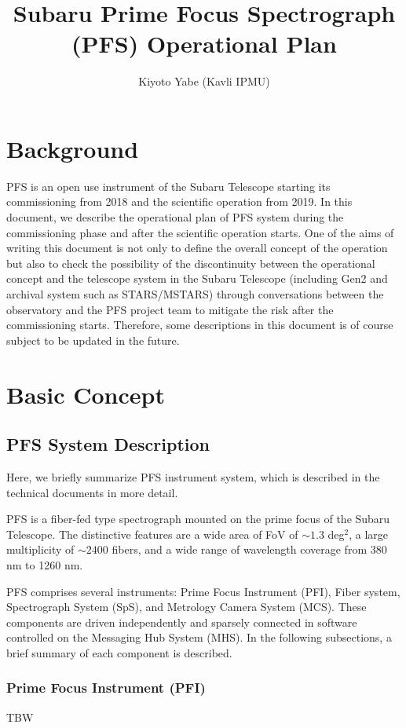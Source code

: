 \documentclass[a4paper]{article}
\title{Subaru Prime Focus Spectrograph (PFS) Operational Plan}
\author{Kiyoto Yabe (Kavli IPMU)}
\begin{document}
\maketitle
\tableofcontents

\clearpage
\section{Background}
PFS is an open use instrument of the Subaru Telescope starting its commissioning from 2018 and the scientific operation from 2019. In this document, we describe the operational plan of PFS system during the commissioning phase and after the scientific operation starts. One of the aims of writing this document is not only to define the overall concept of the operation but also to check the possibility of the discontinuity between the operational concept and the telescope system in the Subaru Telescope (including Gen2 and archival system such as STARS/MSTARS) through conversations between the observatory and the PFS project team to mitigate the risk after the commissioning starts. Therefore, some descriptions in this document is of course subject to be updated in the future.

\section{Basic Concept}
\subsection{PFS System Description\label{sec:pfs_system}}
Here, we briefly summarize PFS instrument system, which is described in the technical documents in more detail. 

PFS is a fiber-fed type spectrograph mounted on the prime focus of the Subaru Telescope. The distinctive features are a wide area of FoV of $\sim1.3$ deg$^{2}$, a large multiplicity of $\sim2400$ fibers, and a wide range of wavelength coverage from 380 nm to 1260 nm. 

PFS comprises several instruments: Prime Focus Instrument (PFI), Fiber system, Spectrograph System (SpS), and Metrology Camera System (MCS). These components are driven independently and sparsely connected in software controlled on the Messaging Hub System (MHS). In the following subsections, a brief summary of each component is described.

\subsubsection{Prime Focus Instrument (PFI)\label{sec:pfs_system:pfi}}
TBW
\end{document}
